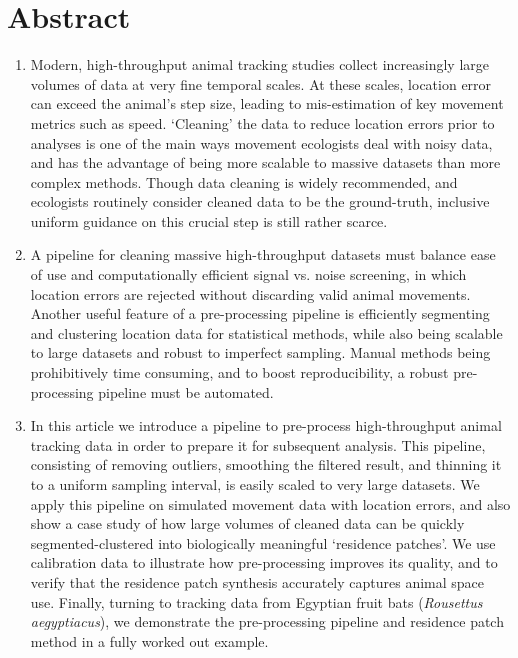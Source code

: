 \documentclass[10pt,paper=a4,headings=standardclasses
]{scrartcl}
\begin{document}
\newpage

\linenumbers

\section*{Abstract} %
\noindent
\begin{enumerate}
    \item Modern, high-throughput animal tracking studies collect increasingly large volumes of data at very fine temporal scales.
    At these scales, location error can exceed the animal's step size, leading to mis-estimation of key movement metrics such as speed.
    `Cleaning' the data to reduce location errors prior to analyses is one of the main ways movement ecologists deal with noisy data, and has the advantage of being more scalable to massive datasets than more complex methods.
    Though data cleaning is widely recommended, and ecologists routinely consider cleaned data to be the ground-truth, inclusive uniform guidance on this crucial step is still rather scarce.
    
    \item A pipeline for cleaning massive high-throughput datasets must balance ease of use and computationally efficient signal vs. noise screening, in which location errors are rejected without discarding valid animal movements.
    Another useful feature of a pre-processing pipeline is efficiently segmenting and clustering location data for statistical methods, while also being scalable to large datasets and robust to imperfect sampling.
    Manual methods being prohibitively time consuming, and to boost reproducibility, a robust pre-processing pipeline must be automated.
    
    \item In this article we introduce a pipeline to pre-process high-throughput animal tracking data in order to prepare it for subsequent analysis.
    This pipeline, consisting of removing outliers, smoothing the filtered result, and thinning it to a uniform sampling interval, is easily scaled to very large datasets.
    We apply this pipeline on simulated movement data with location errors, and also show a case study of how large volumes of cleaned data can be quickly segmented-clustered into biologically meaningful ‘residence patches’.
    We use calibration data to illustrate how pre-processing improves its quality, and to verify that the residence patch synthesis accurately captures animal space use.
    Finally, turning to tracking data from Egyptian fruit bats (\textit{Rousettus aegyptiacus}), we demonstrate the pre-processing pipeline and residence patch method in a fully worked out example.
    

\end{enumerate}
\end{document}
